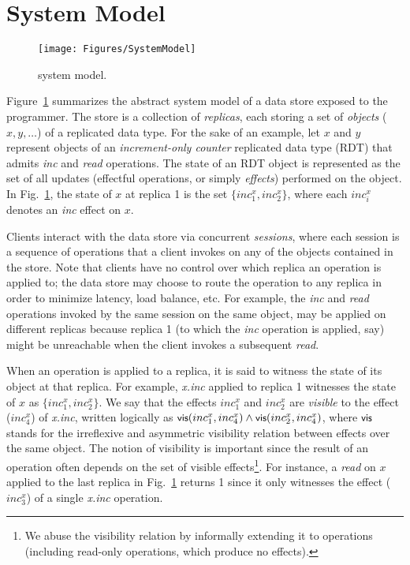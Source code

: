 \section{System Model}
\label{sec:sysmod}

\begin{figure}
\centering
\texttt{[image: Figures/SystemModel]}
\caption{\name system model.}
\label{fig:sysmod}
\end{figure}

Figure~\ref{fig:sysmod} summarizes the abstract system model of a data
store exposed to the \name programmer. The store is a collection of
\emph{replicas}, each storing a set of \emph{objects} ($x,y,\ldots$)
of a replicated data type. For the sake of an example,  let $x$ and
$y$ represent objects of an \emph{increment-only counter} replicated
data type (RDT) that admits \emph{inc} and \emph{read} operations. The
state of an RDT object is represented as the set of all updates
(effectful operations, or simply \emph{effects}) performed on the
object. In Fig.~\ref{fig:sysmod}, the state of $x$ at replica 1 is the
set $\{inc^x_1,inc^x_2\}$, where each $inc^x_i$ denotes an \emph{inc}
effect on $x$.

Clients interact with the data store via concurrent \emph{sessions},
where each session is a sequence of operations that a client invokes
on any of the objects contained in the store. Note that clients have
no control over which replica an operation is applied to; the data
store may choose to route the operation to any replica in order to
minimize latency, load balance, etc. For example, the \emph{inc} and
\emph{read} operations invoked by the same session on the same object,
may be applied on different replicas because replica 1 (to which the
\emph{inc} operation is applied, say) might be unreachable when the
client invokes a subsequent \emph{read}.

When an operation is applied to a replica, it is said to witness the
state of its object at that replica.  For example, \emph{x.inc}
applied to replica 1 witnesses the state of $x$ as
$\{inc^x_1,inc^x_2\}$.  We say that the effects $inc^x_1$ and
$inc^x_2$ are \emph{visible} to the effect ($inc^x_4$) of
\emph{x.inc}, written logically as $\small {\normalfont \textsf{vis}(inc^x_1,inc^x_4)}
\wedge {\normalfont \textsf{vis}(inc^x_2,inc^x_4)}$, where $\small {\normalfont \textsf{vis}}$ stands for the
irreflexive and asymmetric visibility relation between effects over
the same object. The notion of visibility is important since the
result of an operation often depends on the set of visible
effects\footnote{We abuse the visibility relation by informally
  extending it to operations (including read-only operations, which
  produce no effects).}. For instance, a \emph{read} on $x$ applied to
the last replica in Fig.~\ref{fig:sysmod} returns 1 since it only
witnesses the effect ($inc^x_3$) of a single \emph{x.inc} operation.

